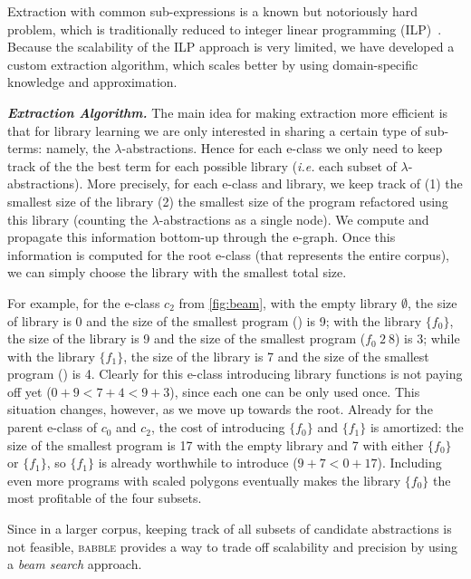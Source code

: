 \documentclass[acmsmall,screen,nonacm,review=false,timestamp=false]{acmart}
\newcommand{\ie}{\emph{i.e.}\xspace}
\newcommand{\emphbf}[1]{\emph{\textbf{#1}\xspace}}
\newcommand{\mypara}[1]{\smallskip\noindent\emphbf{#1.}\xspace}
\newcommand{\tname}[1]{\textsc{#1}\xspace}
\newcommand{\tool}{\tname{babble}}
\begin{document}
Extraction with common sub-expressions is a known but notoriously hard problem,
which is traditionally reduced to integer linear programming (ILP)~\cite{tensat,spores}.
Because the scalability of the ILP approach is very limited,
we have developed a custom extraction algorithm,
which scales better by using domain-specific knowledge and approximation.


\mypara{Extraction Algorithm}
The main idea for making extraction more efficient is that
for library learning we are only interested in sharing a certain type of sub-terms:
namely, the $\lambda$-abstractions.
Hence for each e-class we only need to keep track
of the the best term for each possible library
(\ie each subset of $\lambda$-abstractions).
More precisely, for each e-class and library,
we keep track of
  (1) the smallest size of the library
  (2) the smallest size of the program refactored using this library 
  (counting the $\lambda$-abstractions as a single node).
We compute and propagate this information bottom-up through the e-graph.
Once this information is computed for the root e-class
(that represents the entire corpus),
we can simply choose the library with the smallest total size.

For example, for the e-class $c_2$ from \autoref{fig:beam},
with the empty library $\emptyset$, the size of library is 0 and the size of the smallest program () is 9;
with the library $\{f_0\}$, the size of the library is 9 and the size of the smallest program ($f_0\ 2\ 8$) is 3;
while with the library $\{f_1\}$, the size of the library is 7 and the size of the smallest program () is 4.
Clearly for this e-class introducing library functions is not paying off yet ($0 + 9 < 7 + 4 < 9 + 3$),
since each one can be only used once.
This situation changes, however, as we move up towards the root.
Already for the parent e-class of $c_0$ and $c_2$,
the cost of introducing $\{f_0\}$ and $\{f_1\}$ is amortized:
the size of the smallest program is 17 with the empty library and 7 with either $\{f_0\}$ or $\{f_1\}$,
so $\{f_1\}$ is already worthwhile to introduce ($9 + 7 < 0 + 17$).
Including even more programs with scaled polygons eventually makes the library $\{f_0\}$ the most profitable of the four subsets.

Since in a larger corpus, keeping track of all subsets of candidate abstractions is not feasible,
\tool provides a way to trade off scalability and precision
by using a \emph{beam search} approach.
\end{document}
